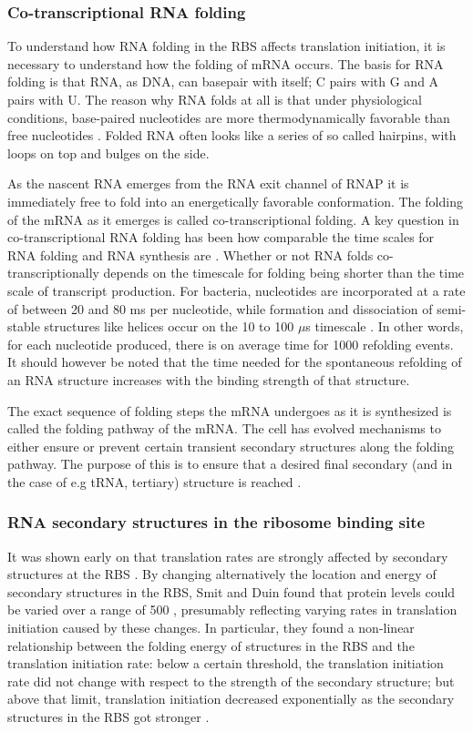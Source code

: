 \subsubsection{Co-transcriptional RNA folding}
To understand how RNA folding in the RBS  affects translation initiation, it is
necessary to understand how the folding of mRNA occurs. The basis for RNA
folding is that RNA, as DNA, can basepair with itself; C pairs with G and A
pairs with U. The reason why RNA folds at all is that under physiological
conditions, base-paired nucleotides are more thermodynamically favorable than
free nucleotides \cite{onoa_rna_2004}. Folded RNA often looks like a series of
so called hairpins, with loops on top and bulges on the side.

As the nascent RNA emerges from the RNA exit channel of RNAP it is immediately
free to fold into an energetically favorable conformation. The folding of the
mRNA as it emerges is called co-transcriptional folding. A key question in
co-transcriptional RNA folding has been how comparable the time scales for RNA
folding and RNA synthesis are \cite{de_smit_translational_2003-1}. Whether or
not RNA folds co-transcriptionally depends on the timescale for folding being
shorter than the time scale of transcript production. For bacteria, nucleotides
are incorporated at a rate of between 20 and 80 ms per nucleotide, while
formation and dissociation of semi-stable structures like helices occur on the
10 to 100 $\mu$s timescale \cite{isambert_jerky_2009}. In other words, for each
nucleotide produced, there is on average time for 1000 refolding events. It
should however be noted that the time needed for the spontaneous refolding of
an RNA structure increases with the binding strength of that structure.

The exact sequence of folding steps the mRNA undergoes as it is synthesized is
called the folding pathway of the mRNA. The cell has evolved mechanisms to
either ensure or prevent certain transient secondary structures along the
folding pathway. The purpose of this is to ensure that a desired final
secondary (and in the case of e.g tRNA, tertiary) structure is reached
\cite{pan_rna_2006-1}.

\subsubsection{RNA secondary structures in the ribosome binding site} It was
shown early on that translation rates are strongly affected by secondary
structures at the RBS \cite{hall_role_1982}. By changing alternatively the
location and energy of secondary structures in the RBS, Smit and Duin found
that protein levels could be varied over a range of 500
\cite{de_smit_secondary_1990}, presumably reflecting varying rates in
translation initiation caused by these changes. In particular, they found a
non-linear relationship between the folding energy of structures in the RBS and
the translation initiation rate: below a certain threshold, the translation
initiation rate did not change with respect to the strength of the secondary
structure; but above that limit, translation initiation decreased exponentially
as the secondary structures in the RBS got stronger
\cite{de_smit_secondary_1990}.

